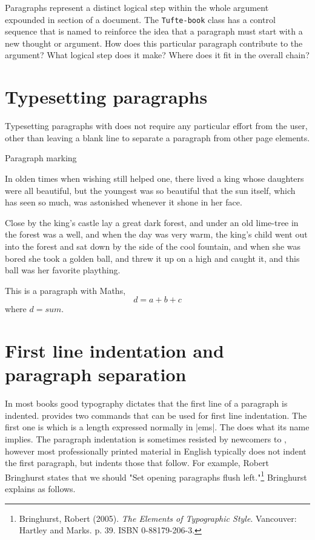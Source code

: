 Paragraphs represent a distinct logical step within the whole argument expounded in section of a document. The \texttt{Tufte-book} class has a control sequence that is named  to reinforce the idea that a paragraph must start with a new thought or argument. How does this particular paragraph contribute to the argument? 
What logical step does it make? Where does it fit in the overall chain?

\section{Typesetting paragraphs}

Typesetting paragraphs with \tex does not require any particular effort from the user, other than leaving a blank line to separate a paragraph from other page elements.

\begin{texexample}{Paragraph marking}{} 

In olden times when wishing
still helped one, there lived a
king whose daughters were all
beautiful, but the youngest was so
beautiful that the sun itself,
which has seen so much, was
astonished whenever it shone in
her face. 

Close by the king's
castle lay a great dark forest,
and under an old lime-tree in the
forest was a well, and when
the day was very warm, the
king's child went out into the 
forest and sat down by the side
of the cool fountain, and when she was bored she
took a golden ball, and threw it up on a high and caught it, and this
ball was her favorite plaything.

 This is a paragraph with Maths,
 \[d=a+b+c\]
 where $d=sum$.
\end{texexample}

\section{First line indentation and paragraph separation}

In most books good typography dictates that the first line of a paragraph is indented. \tex provides two commands that can be used for first line indentation. The first one is  which is a length expressed normally in |ems|. The  does what its name implies. The paragraph indentation is sometimes resisted by newcomers to \tex, however most professionally printed material in English typically does not indent the first paragraph, but indents those that follow. For example, Robert Bringhurst states that we should "Set opening paragraphs flush left."\footnote{Bringhurst, Robert (2005). \textit{The Elements of Typographic Style}. Vancouver: Hartley and Marks. p. 39. ISBN 0-88179-206-3.} Bringhurst explains as follows.

